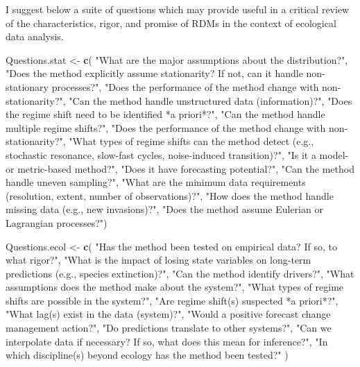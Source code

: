 \documentclass[12pt,twoside,openany]{reedthesis}
\newenvironment{Shaded}{\begin{snugshade}}{\end{snugshade}}
\newcommand{\KeywordTok}[1]{\textcolor[rgb]{0.13,0.29,0.53}{\textbf{#1}}}
\newcommand{\NormalTok}[1]{#1}
\newcommand{\StringTok}[1]{\textcolor[rgb]{0.31,0.60,0.02}{#1}}
\begin{document}
I suggest below a suite of questions which may provide useful in a critical review of the characteristics, rigor, and promise of RDMs in the context of ecological data analysis.
\begin{Shaded}
\begin{Highlighting}[]
\NormalTok{Questions.stat <-}\StringTok{ }\KeywordTok{c}\NormalTok{(}
  \StringTok{"What are the major assumptions about the distribution?"}\NormalTok{,}
  \StringTok{"Does the method explicitly assume stationarity? If not, can it handle non-stationary processes?"}\NormalTok{, }
  \StringTok{"Does the performance of the method change with non-stationarity?"}\NormalTok{,}
  \StringTok{"Can the method handle unstructured data (information)?"}\NormalTok{,}
  \StringTok{"Does the regime shift need to be identified *a priori*?"}\NormalTok{,}
  \StringTok{"Can the method handle multiple regime shifts?"}\NormalTok{,}
  \StringTok{"Does the performance of the method change with non-stationarity?"}\NormalTok{,}
  \StringTok{"What types of regime shifts can the method detect (e.g., stochastic resonance, slow-fast cycles, noise-induced transition)?"}\NormalTok{,}
  \StringTok{"Is it a model- or metric-based method?"}\NormalTok{, }
  \StringTok{"Does it have forecasting potential?"}\NormalTok{,}
  \StringTok{"Can the method handle uneven sampling?"}\NormalTok{,}
  \StringTok{"What are the minimum data requirements (resolution, extent, number of observations)?"}\NormalTok{,}
  \StringTok{"How does the method handle missing data (e.g., new invasions)?"}\NormalTok{, }
  \StringTok{"Does the method assume Eulerian or Lagrangian processes?"}\NormalTok{)}

\NormalTok{Questions.ecol <-}\StringTok{ }\KeywordTok{c}\NormalTok{(}
  \StringTok{"Has the method been tested on empirical data? If so, to what rigor?"}\NormalTok{,}
  \StringTok{"What is the impact of losing state variables on long-term predictions (e.g., species extinction)?"}\NormalTok{,}
  \StringTok{"Can the method identify drivers?"}\NormalTok{,}
  \StringTok{"What assumptions does the method make about the system?"}\NormalTok{, }
  \StringTok{"What types of regime shifts are possible in the system?"}\NormalTok{, }
  \StringTok{"Are regime shift(s) suspected *a priori*?"}\NormalTok{,}
  \StringTok{"What lag(s) exist in the data (system)?"}\NormalTok{,}
  \StringTok{"Would a positive forecast change management action?"}\NormalTok{,}
  \StringTok{"Do predictions translate to other systems?"}\NormalTok{,}
  \StringTok{"Can we interpolate data if necessary? If so, what does this mean for inference?"}\NormalTok{,}
  \StringTok{"In which discipline(s) beyond ecology has the method been tested?"}
\NormalTok{  )}


\end{Highlighting}
\end{Shaded}
\end{document}
